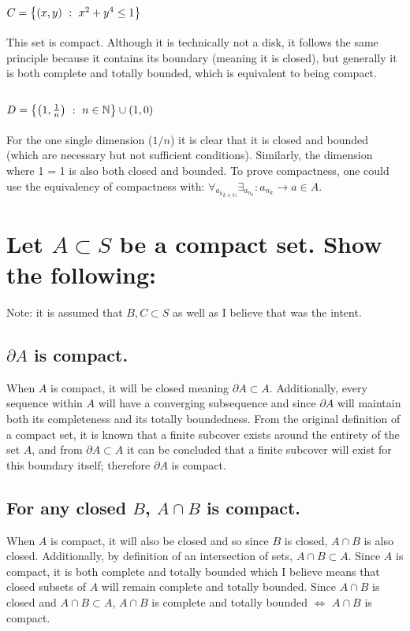 \documentclass[]{article}
\newcommand{\N}{\mathbb{N}}
\newcommand{\st}{\ : \ }
\begin{document}
\subsection{$C = \qty{(x,y) \st x^2+y^4 \leq 1}$}
This set is compact. Although it is technically not a disk, it follows the same principle because it contains its boundary (meaning it is closed), but generally it is both complete and totally bounded, which is equivalent to being compact.

\subsection{$D = \qty{\qty(1,\frac{1}{n}) \st n \in \N} \cup (1,0)$}
For the one single dimension ($1/n$) it is clear that it is closed and bounded (which are necessary but not sufficient conditions). 
Similarly, the dimension where 1 = 1 is also both closed and bounded. 
To prove compactness, one could use the equivalency of compactness with: $\forall_{{a_k}_{k\in \N}} \exists_{{a_{n_k}}} : a_{n_k} \to a \in A$.

\newpage
\section{Let $A \subset S$ be a compact set. Show the following:}
Note: it is assumed that $B, C \subset S$ as well as I believe that was the intent.
\subsection{$\partial A$ is compact.}
When $A$ is compact, it will be closed meaning $\partial A \subset A$. 
Additionally, every sequence within $A$ will have a converging subsequence and since $\partial A$ will maintain both its completeness and its totally boundedness. 
From the original definition of a compact set, it is known that a finite subcover exists around the entirety of the set $A$, and from $\partial A \subset A$ it can be concluded that a finite subcover will exist for this boundary itself; therefore $\partial A$ is compact.

\subsection{For any closed $B$, $A \cap B$ is compact.}
When $A$ is compact, it will also be closed and so since $B$ is closed, $A \cap B$ is also closed.
Additionally, by definition of an intersection of sets, $A \cap B \subset A$.
Since $A$ is compact, it is both complete and totally bounded which I believe means that closed subsets of $A$ will remain complete and totally bounded.
Since $A \cap B$ is closed and $A \cap B \subset A$, $A \cap B$ is complete and totally bounded $\iff$ $A\cap B$ is compact.
\end{document}
